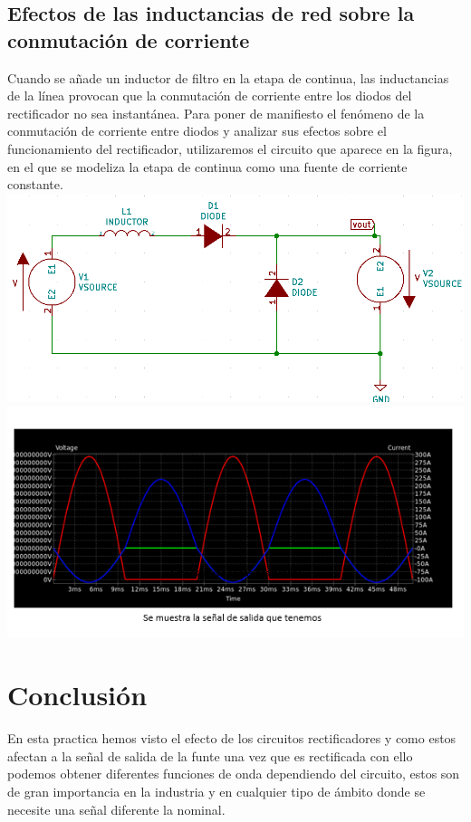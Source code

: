 \documentclass[12pt,a4paper]{article}
\begin{document}
\subsection{Efectos de las inductancias de red sobre la conmutación de corriente}
\begin{flushleft}
Cuando se añade un inductor de filtro en la etapa de continua, las inductancias de la línea provocan que la conmutación de corriente entre los diodos del rectificador no sea instantánea. 
Para poner de manifiesto el fenómeno de la conmutación de corriente entre diodos y analizar sus efectos sobre el funcionamiento del rectificador, utilizaremos el circuito que aparece en la figura, en el que se modeliza la etapa de continua como una fuente de corriente constante.
\includegraphics[scale=0.7]{imagenes/p7/Circuito7.png} 
\includegraphics[scale=1]{imagenes/p7/onda.PNG} 
\end{flushleft}
\newpage
\section{Conclusión}
\begin{flushleft}
En esta practica hemos visto el efecto de los circuitos rectificadores y como estos afectan a la señal de salida de la funte una vez que es rectificada con ello podemos obtener diferentes funciones de onda dependiendo del circuito, estos son de gran importancia en la industria y en cualquier tipo de ámbito donde se necesite una señal diferente la nominal.
\end{flushleft}
\end{document}
